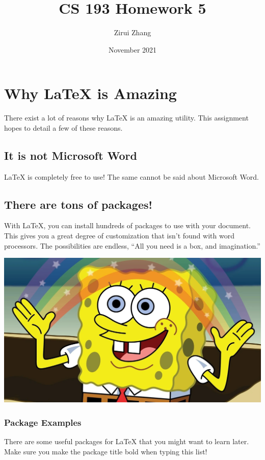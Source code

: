 \documentclass{article}
\title{CS 193 Homework 5}
\author{Zirui Zhang}
\date{November 2021}
\begin{document}
\maketitle

\section{Why LaTeX is Amazing}
{There exist a lot of reasons why LaTeX is an amazing utility. This assignment hopes to detail a few of these reasons.}
\subsection{It is not Microsoft Word}
{LaTeX is completely free to use! The same cannot be said about Microsoft Word.}
\subsection{There are tons of packages!}
{With LaTeX, you can install hundreds of packages to use with your document. This gives you a great degree of customization that isn’t found with word processors. The possibilities are endless, “All you need is a box, and imagination.”}
\begin{center}
\includegraphics[scale=0.17]{imagination.png}
\end{center}
\subsubsection{Package Examples}
{There are some useful packages for LaTeX that you might want to learn later. Make sure you make the package title bold when typing this list!}



\end{document}
